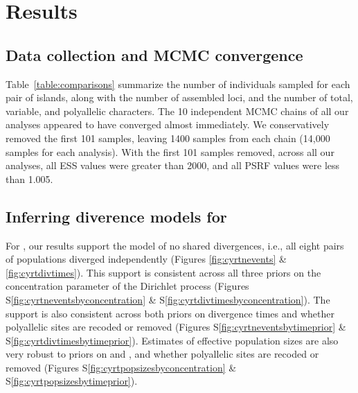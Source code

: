 \section{Results}

\subsection{Data collection and MCMC convergence}
Table~\ref{table:comparisons} summarize the number of individuals sampled for
each pair of islands, along with the number of assembled loci, and the number
of total, variable, and polyallelic characters.
The 10 independent MCMC chains of all our \ecoevolity analyses appeared to have
converged almost immediately.
We conservatively removed the first 101 samples, leaving 1400 samples from each
chain (14,000 samples for each analysis).
With the first 101 samples removed, across all our analyses, all ESS values
were greater than 2000, and all PSRF values were less than 1.005.

\subsection{Inferring diverence models for }
For , our \ecoevolity results support the model of no shared
divergences, i.e., all eight pairs of populations diverged independently
(Figures \ref{fig:cyrtnevents} \& \ref{fig:cyrtdivtimes}).
This support is consistent across all three priors on the concentration
parameter of the Dirichlet process
(Figures
S\ref{fig:cyrtneventsbyconcentration}
\&
S\ref{fig:cyrtdivtimesbyconcentration}).
The support is also consistent across both priors on divergence times
and whether polyallelic sites are recoded or removed
(Figures
S\ref{fig:cyrtneventsbytimeprior}
\&
S\ref{fig:cyrtdivtimesbytimeprior}).
Estimates of effective population sizes are also very robust to
priors on \concentration and \divtime, and whether polyallelic sites
are recoded or removed
(Figures
S\ref{fig:cyrtpopsizesbyconcentration}
\&
S\ref{fig:cyrtpopsizesbytimeprior}).

